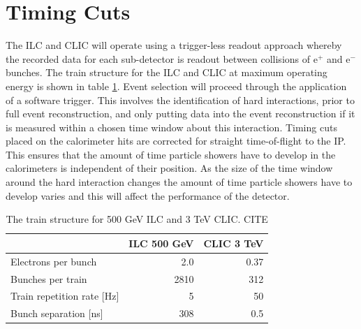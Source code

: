 \section{Timing Cuts}
The ILC and CLIC will operate using a trigger-less readout approach whereby the recorded data for each sub-detector is readout between collisions of $\text{e}^{+}$ and $\text{e}^{-}$ bunches.  The train structure for the ILC and CLIC at maximum operating energy is shown in table \ref{table:trainstructure}.  Event selection will proceed through the application of a software trigger.  This involves the identification of hard interactions, prior to full event reconstruction, and only putting data into the event reconstruction if it is measured within a chosen time window about this interaction.  Timing cuts placed on the calorimeter hits are corrected for straight time-of-flight to the IP.  This ensures that the amount of time particle showers have to develop in the calorimeters is independent of their position.  As the size of the time window around the hard interaction changes the amount of time particle showers have to develop varies and this will affect the performance of the detector. 


\begin{table}[h!]
\centering
\begin{tabular}{l r r}
\hline
& ILC 500 GeV & CLIC 3 TeV \\
\hline
Electrons per bunch & 2.0 & 0.37 \\
Bunches per train & 2810 & 312 \\
Train repetition rate [Hz] & 5 & 50 \\
Bunch separation [ns] & 308 & 0.5 \\
\end{tabular}
\caption[The train structure for 500 GeV ILC and 3 TeV CLIC.]{The train structure for 500 GeV ILC and 3 TeV CLIC.  CITE}
\label{table:trainstructure}
\end{table}

